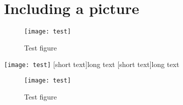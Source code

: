 \documentclass[a5paper]{article}
\begin{document}
\section{Including a picture}
\blindtext
\begin{figure}[ht]
\centering
\texttt{[image: test]}
\caption{Test figure}
\end{figure}
\blindtext
 \afterpage{\clearpage}


 \begin{center}
 \begin{minipage}{\linewidth}%
 \centering%
 \texttt{[image: test]}%
 [short text]{long text}
 [short text]{long text}
 \end{minipage}
 \end{center}

\begin{figure}[H]
 \centering
 \texttt{[image: test]}
 \caption{Test figure}
 \end{figure}
\end{document}
